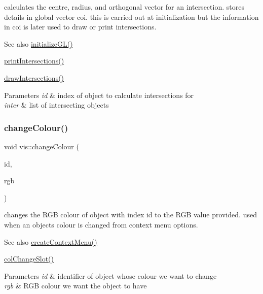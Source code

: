 calculates the centre, radius, and orthogonal vector for an intersection. stores details in global vector coi. this is carried out at initialization but the information in coi is later used to draw or print intersections.

\begin{DoxySeeAlso}{See also}
\mbox{\hyperlink{classvis_aacc3b133f9fae3b66e1e13bfe789f314}{initialize\+G\+L()}} 

\mbox{\hyperlink{classvis_a9d087bde79e6856772dc3a1f6f89294e}{print\+Intersections()}} 

\mbox{\hyperlink{classvis_aca1eb70cb49a572f7d34916aec3d95da}{draw\+Intersections()}} 
\end{DoxySeeAlso}

\begin{DoxyParams}{Parameters}
{\em id} & index of object to calculate intersections for \\
\hline
{\em inter} & list of intersecting objects \\
\hline
\end{DoxyParams}
\mbox{\label{classvis_a4c13659b0c56047739c82f04a3dd317c}} 
\subsubsection{\texorpdfstring{change\+Colour()}{changeColour()}}
{\footnotesize\ttfamily void vis\+::change\+Colour (\begin{DoxyParamCaption}\item[{int}]{id,  }\item[{\mbox{\hyperlink{struct_r_g_b_a}{R\+G\+BA}}}]{rgb }\end{DoxyParamCaption})}

changes the R\+GB colour of object with index id to the R\+GB value provided. used when an objects colour is changed from context menu options.

\begin{DoxySeeAlso}{See also}
\mbox{\hyperlink{classvis_a63af66f730f0f06f36d255bcc7a7a244}{create\+Context\+Menu()}} 

\mbox{\hyperlink{classvis_ad217326086a9f0cfc1e35df9c7ccf9c0}{col\+Change\+Slot()}} 
\end{DoxySeeAlso}

\begin{DoxyParams}{Parameters}
{\em id} & identifier of object whose colour we want to change \\
\hline
{\em rgb} & R\+GB colour we want the object to have \\
\hline
\end{DoxyParams}
\mbox{\label{classvis_a430b507667b18e74b1a6f1b68377c1f8}} 
